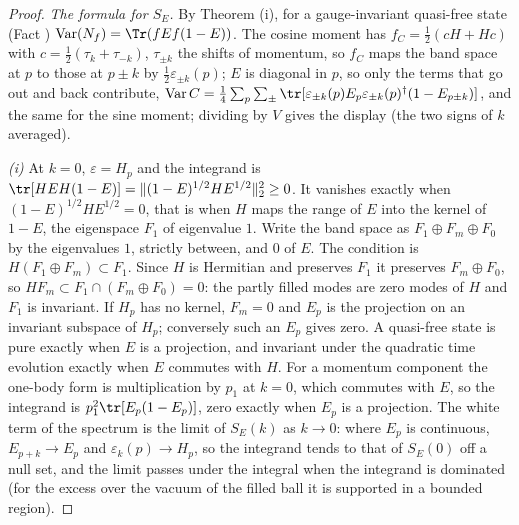 \begin{proof}
\emph{The formula for $S_{E}$.} By Theorem (i), for a gauge-invariant quasi-free state (Fact ) $\mathrm{Var}(N_{f}) = \Tr(fEf(1 - E))$. The cosine moment has $f_{C} = \tfrac12(cH + Hc)$ with $c = \tfrac12(\tau_{k} + \tau_{-k})$, $\tau_{\pm k}$ the shifts of momentum, so $f_{C}$ maps the band space at $p$ to those at $p \pm k$ by $\tfrac12\varepsilon_{\pm k}(p)$; $E$ is diagonal in $p$, so only the terms that go out and back contribute, $\mathrm{Var}\,C = \tfrac14\sum_{p}\sum_{\pm}\tr[\varepsilon_{\pm k}(p)E_{p}\varepsilon_{\pm k}(p)^{\dagger}(1 - E_{p \pm k})]$, and the same for the sine moment; dividing by $V$ gives the display (the two signs of $k$ averaged).

\emph{(i)} At $k = 0$, $\varepsilon = H_{p}$ and the integrand is $\tr[HEH(1 - E)] = \|(1 - E)^{1/2}HE^{1/2}\|_{2}^{2} \ge 0$. It vanishes exactly when $(1 - E)^{1/2}HE^{1/2} = 0$, that is when $H$ maps the range of $E$ into the kernel of $1 - E$, the eigenspace $F_{1}$ of eigenvalue $1$. Write the band space as $F_{1} \oplus F_{m} \oplus F_{0}$ by the eigenvalues $1$, strictly between, and $0$ of $E$. The condition is $H(F_{1} \oplus F_{m}) \subset F_{1}$. Since $H$ is Hermitian and preserves $F_{1}$ it preserves $F_{m} \oplus F_{0}$, so $HF_{m} \subset F_{1} \cap (F_{m} \oplus F_{0}) = 0$: the partly filled modes are zero modes of $H$ and $F_{1}$ is invariant. If $H_{p}$ has no kernel, $F_{m} = 0$ and $E_{p}$ is the projection on an invariant subspace of $H_{p}$; conversely such an $E_{p}$ gives zero. A quasi-free state is pure exactly when $E$ is a projection, and invariant under the quadratic time evolution exactly when $E$ commutes with $H$. For a momentum component the one-body form is multiplication by $p_{1}$ at $k = 0$, which commutes with $E$, so the integrand is $p_{1}^{2}\tr[E_{p}(1 - E_{p})]$, zero exactly when $E_{p}$ is a projection. The white term of the spectrum is the limit of $S_{E}(k)$ as $k \to 0$: where $E_{p}$ is continuous, $E_{p + k} \to E_{p}$ and $\varepsilon_{k}(p) \to H_{p}$, so the integrand tends to that of $S_{E}(0)$ off a null set, and the limit passes under the integral when the integrand is dominated (for the excess over the vacuum of the filled ball it is supported in a bounded region).


\end{proof}
